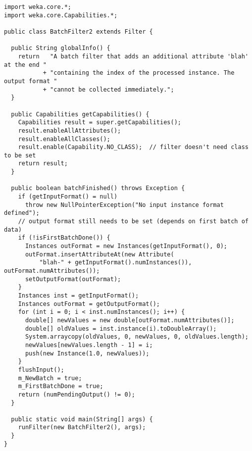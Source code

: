 
\begin{verbatim}
import weka.core.*;
import weka.core.Capabilities.*;

public class BatchFilter2 extends Filter {

  public String globalInfo() {
    return   "A batch filter that adds an additional attribute 'blah' at the end "
           + "containing the index of the processed instance. The output format "
           + "cannot be collected immediately.";
  }

  public Capabilities getCapabilities() {
    Capabilities result = super.getCapabilities();
    result.enableAllAttributes();
    result.enableAllClasses();
    result.enable(Capability.NO_CLASS);  // filter doesn't need class to be set
    return result;
  }

  public boolean batchFinished() throws Exception {
    if (getInputFormat() = null)
      throw new NullPointerException("No input instance format defined");
    // output format still needs to be set (depends on first batch of data)
    if (!isFirstBatchDone()) {
      Instances outFormat = new Instances(getInputFormat(), 0);
      outFormat.insertAttributeAt(new Attribute(
          "blah-" + getInputFormat().numInstances()), outFormat.numAttributes());
      setOutputFormat(outFormat);
    }
    Instances inst = getInputFormat();
    Instances outFormat = getOutputFormat();
    for (int i = 0; i < inst.numInstances(); i++) {
      double[] newValues = new double[outFormat.numAttributes()];
      double[] oldValues = inst.instance(i).toDoubleArray();
      System.arraycopy(oldValues, 0, newValues, 0, oldValues.length);
      newValues[newValues.length - 1] = i;
      push(new Instance(1.0, newValues));
    }
    flushInput();
    m_NewBatch = true;
    m_FirstBatchDone = true;
    return (numPendingOutput() != 0);
  }

  public static void main(String[] args) {
    runFilter(new BatchFilter2(), args);
  }
}
\end{verbatim}

